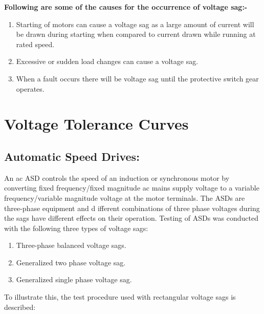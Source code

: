 \documentclass[17pt, a4paper]{extreport}
\begin{document}
\textbf{Following are some of the causes for the occurrence of voltage sag:-}\begin{enumerate}
    \item Starting of motors can cause a voltage sag as a large amount of current will be drawn during starting when compared to current drawn while running at rated speed.
    
    \item Excessive or sudden load changes can cause a voltage sag.
    
    \item 	When a fault occurs there will be voltage sag until the protective switch gear operates.
\end{enumerate}

\section[Voltage Tolerance Curves]{Voltage Tolerance Curves}
\subsection{Automatic Speed Drives:} An ac ASD controls the speed of an induction or synchronous motor by converting fixed frequency/fixed magnitude ac mains supply voltage to a variable frequency/variable magnitude voltage at the motor terminals.  The ASDs are three-phase equipment and d ifferent combinations of three phase voltages during the sags have different effects on their operation. Testing of ASDs was conducted with the following three types of voltage sags:

\begin{enumerate}
    \item Three-phase balanced voltage sags.
    \item Generalized two phase voltage sag.
    \item Generalized single phase voltage sag.
\end{enumerate}

 To illustrate this, the test procedure used with rectangular voltage sags is described: 
 
\end{document}
